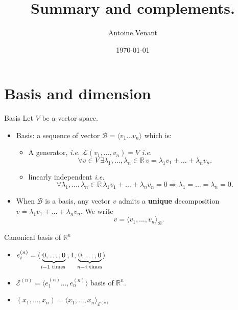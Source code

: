 \documentclass{beamer}
\begin{document}
\title{Summary and complements.} 
\author{Antoine Venant}
\date{\today}

\maketitle


\section{Basis and dimension}

\begin{frame}{Basis}
  Let $V$ be a vector space.

  \begin{itemize}
  \item Basis: a sequence of vector $\mathcal{B} = \langle v_1 \dots v_n \rangle$ which is:
    \begin{itemize}
    \item A generator, \emph{i.e.} $\mathcal{L}(v_1, \dots, v_n ) = V$ \emph{i.e.} \[\forall v \in V\, \exists \lambda_1, \dots, \lambda_n \in \mathbb{R}\, v = \lambda_1 v_1 + \dots + \lambda_n v_n.\]
    \item linearly independent \emph{i.e.} \[\forall \lambda_1,\dots, \lambda_n \in \mathbb{R} \, \lambda_1 v_1 + \dots + \lambda_n v_n = 0 \Rightarrow \lambda_1 = \dots = \lambda_n = 0.\]
    \end{itemize}
  \item When $\mathcal{B}$ is a basis, any vector $v$ admits a {\bf unique} decomposition $v = \lambda_1 v_1 + \dots + \lambda_n v_n$. We write \[v = \langle v_1, \dots, v_n \rangle_{\mathcal{B}}.\]
  \end{itemize}
\end{frame}

\begin{frame}{Canonical basis of $\mathbb{R}^n$}
  \begin{itemize}
  \item $e^{(n)}_i = ( \underbrace{0,\dots, 0}_{i-1 \textnormal{ times }},1,\underbrace{0, \dots, 0}_{n-i \textnormal{ times}} )$
  \item $\mathcal{E}^{(n)} = \langle e^{(n)}_1 \dots, e^{(n)}_n \rangle$ basis of $\mathbb{R}^n$.
  \item $(x_1, \dots, x_n) = \langle x_1, \dots, x_n \rangle_{\mathcal{E}^{(n)}}$

  \end{itemize}
\end{frame}
\end{document}
